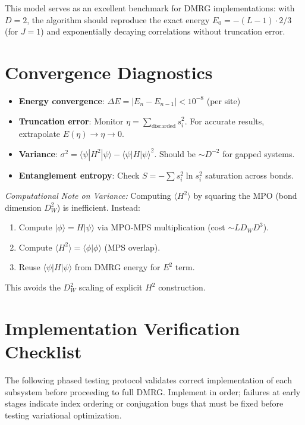 \documentclass[aps,prb,onecolumn,scriptaddress]{revtex4-2}
\newcommand{\ket}[1]{|#1\rangle}
\newcommand{\bra}[1]{\langle#1|}
\newcommand{\braket}[2]{\langle#1|#2\rangle}
\begin{document}
	This model serves as an excellent benchmark for DMRG implementations: with $D=2$, the algorithm should reproduce the exact energy $E_0 = -(L-1) \cdot 2/3$ (for $J=1$) and exponentially decaying correlations without truncation error.
	
	\section{Convergence Diagnostics}
	
	\begin{itemize}
		\item \textbf{Energy convergence}: $\Delta E = |E_{n} - E_{n-1}| < 10^{-8}$ (per site)
		\item \textbf{Truncation error}: Monitor $\eta = \sum_{\text{discarded}} s_i^2$. For accurate results, extrapolate $E(\eta) \to \eta \to 0$.
		\item \textbf{Variance}: $\sigma^2 = \bra{\psi}H^2\ket{\psi} - \bra{\psi}H\ket{\psi}^2$. Should be $\sim D^{-2}$ for gapped systems.
		\item \textbf{Entanglement entropy}: Check $S = -\sum s_i^2 \ln s_i^2$ saturation across bonds.
	\end{itemize}
	
\textit{Computational Note on Variance:} Computing $\langle H^2 \rangle$ by squaring the MPO 
(bond dimension $D_W^2$) is inefficient. Instead:
\begin{enumerate}
	\item Compute $\ket{\phi} = H\ket{\psi}$ via MPO-MPS multiplication (cost $\sim LD_WD^3$).
	\item Compute $\langle H^2 \rangle = \braket{\phi}{\phi}$ (MPS overlap).
	\item Reuse $\langle\psi|H|\psi\rangle$ from DMRG energy for $E^2$ term.
\end{enumerate}
This avoids the $D_W^2$ scaling of explicit $H^2$ construction.

		
	\section{Implementation Verification Checklist}
	\label{sec:verification}
	
	The following phased testing protocol validates correct implementation of each subsystem before proceeding to full DMRG. Implement in order; failures at early stages indicate index ordering or conjugation bugs that must be fixed before testing variational optimization.
	
\end{document}
